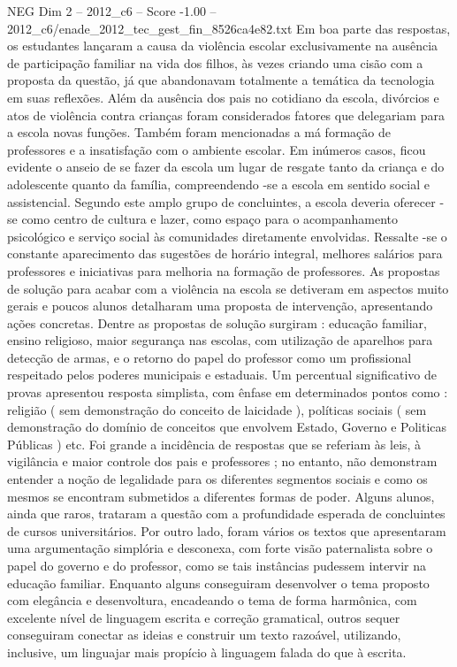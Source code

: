 \begin{textsample}{NEG Dim 2 – 2012\_c6 – Score -1.00 – 2012\_c6/enade\_2012\_tec\_gest\_fin\_8526ca4e82.txt}
Em boa parte das respostas, os estudantes lançaram a causa da violência escolar exclusivamente na ausência de participação familiar na vida dos filhos, às vezes criando uma cisão com a proposta da questão, já que abandonavam totalmente a temática da tecnologia em suas reflexões.
Além da ausência dos pais no cotidiano da escola, divórcios e atos de violência contra crianças foram considerados fatores que delegariam para a escola novas funções.
Também foram mencionadas a má formação de professores e a insatisfação com o ambiente escolar.
Em inúmeros casos, ficou evidente o anseio de se fazer da escola um lugar de resgate tanto da criança e do adolescente quanto da família, compreendendo -se a escola em sentido social e assistencial.
Segundo este amplo grupo de concluintes, a escola deveria oferecer -se como centro de cultura e lazer, como espaço para o acompanhamento psicológico e serviço social às comunidades diretamente envolvidas.
Ressalte -se o constante aparecimento das sugestões de horário integral, melhores salários para professores e iniciativas para melhoria na formação de professores.
As propostas de solução para acabar com a violência na escola se detiveram em aspectos muito gerais e poucos alunos detalharam uma proposta de intervenção, apresentando ações concretas.
Dentre as propostas de solução surgiram : educação familiar, ensino religioso, maior segurança nas escolas, com utilização de aparelhos para detecção de armas, e o retorno do papel do professor como um profissional respeitado pelos poderes municipais e estaduais.
Um percentual significativo de provas apresentou resposta simplista, com ênfase em determinados pontos como : religião ( sem demonstração do conceito de laicidade ), políticas sociais ( sem demonstração do domínio de conceitos que envolvem Estado, Governo e Politicas Públicas ) etc.
Foi grande a incidência de respostas que se referiam às leis, à vigilância e maior controle dos pais e professores ; no entanto, não demonstram entender a noção de legalidade para os diferentes segmentos sociais e como os mesmos se encontram submetidos a diferentes formas de poder.
Alguns alunos, ainda que raros, trataram a questão com a profundidade esperada de concluintes de cursos universitários.
Por outro lado, foram vários os textos que apresentaram uma argumentação simplória e desconexa, com forte visão paternalista sobre o papel do governo e do professor, como se tais instâncias pudessem intervir na educação familiar.
Enquanto alguns conseguiram desenvolver o tema proposto com elegância e desenvoltura, encadeando o tema de forma harmônica, com excelente nível de linguagem escrita e correção gramatical, outros sequer conseguiram conectar as ideias e construir um texto razoável, utilizando, inclusive, um linguajar mais propício à linguagem falada do que à escrita.

\end{textsample}
